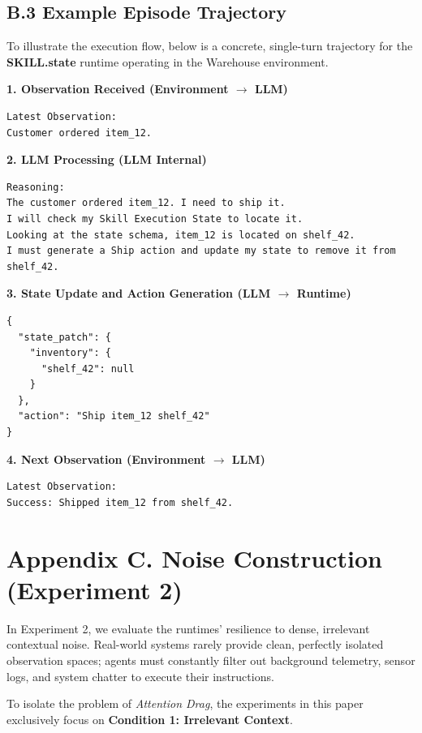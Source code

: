 \documentclass[11pt]{article}
\begin{document}
\subsection*{B.3 Example Episode Trajectory}

To illustrate the execution flow, below is a concrete, single-turn trajectory for the \textbf{SKILL.state} runtime operating in the Warehouse environment.

\noindent\textbf{1. Observation Received (Environment $\rightarrow$ LLM)}
\begin{lstlisting}
Latest Observation:
Customer ordered item_12.
\end{lstlisting}

\noindent\textbf{2. LLM Processing (LLM Internal)}
\begin{lstlisting}
Reasoning:
The customer ordered item_12. I need to ship it.
I will check my Skill Execution State to locate it.
Looking at the state schema, item_12 is located on shelf_42.
I must generate a Ship action and update my state to remove it from shelf_42.
\end{lstlisting}

\noindent\textbf{3. State Update and Action Generation (LLM $\rightarrow$ Runtime)}
\begin{lstlisting}
{
  "state_patch": {
    "inventory": {
      "shelf_42": null
    }
  },
  "action": "Ship item_12 shelf_42"
}
\end{lstlisting}

\noindent\textbf{4. Next Observation (Environment $\rightarrow$ LLM)} 
\begin{lstlisting} 
Latest Observation: 
Success: Shipped item_12 from shelf_42. 
\end{lstlisting}


\section*{Appendix C. Noise Construction (Experiment 2)}
\label{appendix:noise_construction}

In Experiment 2, we evaluate the runtimes' resilience to dense, irrelevant contextual noise. Real-world systems rarely provide clean, perfectly isolated observation spaces; agents must constantly filter out background telemetry, sensor logs, and system chatter to execute their instructions.

To isolate the problem of \textit{Attention Drag}, the experiments in this paper exclusively focus on \textbf{Condition 1: Irrelevant Context}.
\end{document}
